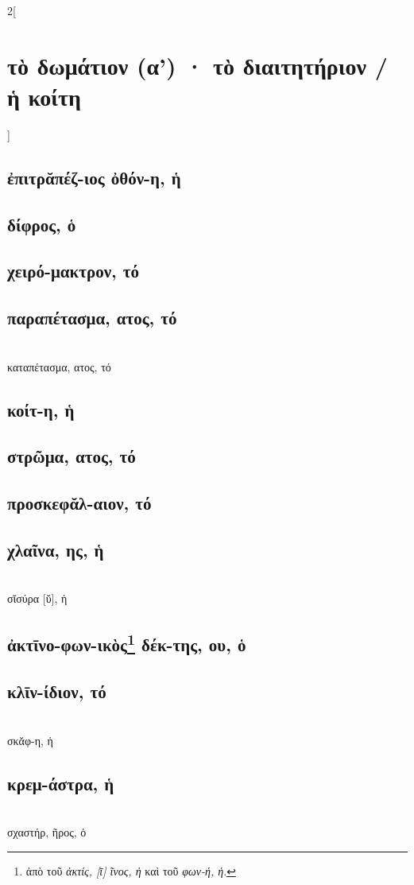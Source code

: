 \documentclass{book}
\begin{document}
\begin{multicols}{2}[\section{τὸ δωμάτιον (α') · τὸ διαιτητήριον / ἡ κοίτη}]
\subsection{ἐπιτρᾰπέζ-ιος ὀθόν-η, ἡ}
\subsection{δίφρος, ὁ}
\subsection{χειρό-μακτρον, τό}
\subsection{παραπέτασμα, ατος, τό}
 ~\\
καταπέτασμα, ατος, τό
\subsection{κοίτ-η, ἡ}
\subsection{στρῶμα, ατος, τό}
\subsection{προσκεφᾰλ-αιον, τό}
\subsection{χλαῖνα, ης, ἡ}
 ~\\
σῐσύρα [ῠ], ἡ
\subsection{ἀκτῑνο-φων-ικὸς\textsuperscript{\textdaggerdbl}\protect\footnote{ἀπὸ τοῦ \emph{ἀκτίς, [ῑ] ῖνος, ἡ} καὶ τοῦ \emph{φων-ή, ἡ}.} δέκ-της, ου, ὁ}
\subsection{κλῑν-ίδιον, τό}
 ~\\
σκᾰφ-η, ἡ
\subsection{κρεμ-άστρα, ἡ}
 ~\\
σχαστήρ, ῆρος, ὁ
~
\end{multicols}
\end{document}
